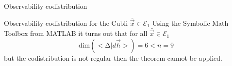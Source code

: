 \begin{frame}{Observability codistribution \cubli}
  \begin{exampleblock}{Observability codistribution for the Cubli \hfill $\bar{\vec{x}} \in \mathcal{E}_{1}$}
    Using the Symbolic Math Toolbox from MATLAB it turns out that for all $\bar{\vec{x}} \in \mathcal{E}_{1}$
    \[
    \mathrm{dim} (<\mathrm{\Delta} | d\vec{h}>) = 6 < n = 9
    \]
    but the codistribution is \alert{not} regular then the theorem \alert{cannot} be applied.
  \end{exampleblock}
\end{frame}
